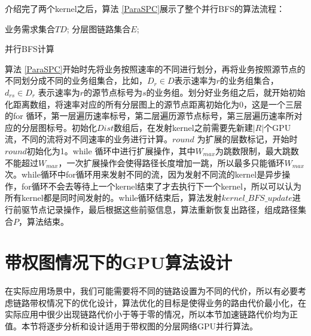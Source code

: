 介绍完了两个kernel之后，算法 \ref{ParaSPC}展示了整个并行BFS的算法流程：
\begin{algorithm}[t]
\begin{algorithmic}[1]
\Require
业务需求集合$TD$;
分层图链路集合$E$;
\Else
{}
\EndIf
{}
\EndFor
\EndFor
\EndFor
\EndFor
{}
\EndFor
{}
\EndWhile
{}
\EndFor
{}
\end{algorithmic}
\caption{{并行BFS计算}}
\label{ParaSPC}
\end{algorithm}
算法 \ref{ParaSPC}开始时先将业务按照速率的不同进行划分，再将业务按照源节点的不同划分成不同的业务组集合，比如，$D_r \in D$表示速率为$r$的业务组集合，$d_{rs} \in D_r$ 表示速率为$r$的源节点标号为$s$的业务组。划分好业务组之后，就开始初始化距离数组，将速率对应的所有分层图上的源节点距离初始化为0，这是一个三层的for 循环，第一层遍历速率标号，第二层遍历源节点标号，第三层遍历速率所对应的分层图标号。初始化$Dist$数组后，在发射kernel之前需要先新建$|R|$个GPU流，不同的流将对不同速率的业务进行计算。$round$ 为扩展的层数标记，开始时$round$初始化为1。while 循环中进行扩展操作，其中$W_{max}$为跳数限制，最大跳数不能超过$W_{max}$，一次扩展操作会使得路径长度增加一跳，所以最多只能循环$W_{max}$次。while循环中for循环用来发射不同的流，因为发射不同流的kernel是异步操作，for循环不会去等待上一个kernel结束了才去执行下一个kernel，所以可以认为所有kernel都是同时间发射的。while循环结束后，算法发射$kernel\_BFS\_update$进行前驱节点记录操作，最后根据这些前驱信息，算法重新恢复出路径，组成路径集合$P$，算法结束。
\section{带权图情况下的GPU算法设计}

在实际应用场景中，我们可能需要将不同的链路设置为不同的代价，所以有必要考虑链路带权情况下的优化设计，算法优化的目标是使得业务的路由代价最小化，在实际应用中很少出现链路代价小于等于零的情况，所以本节加速链路代价均为正值。本节将逐步分析和设计适用于带权图的分层网络GPU并行算法。
